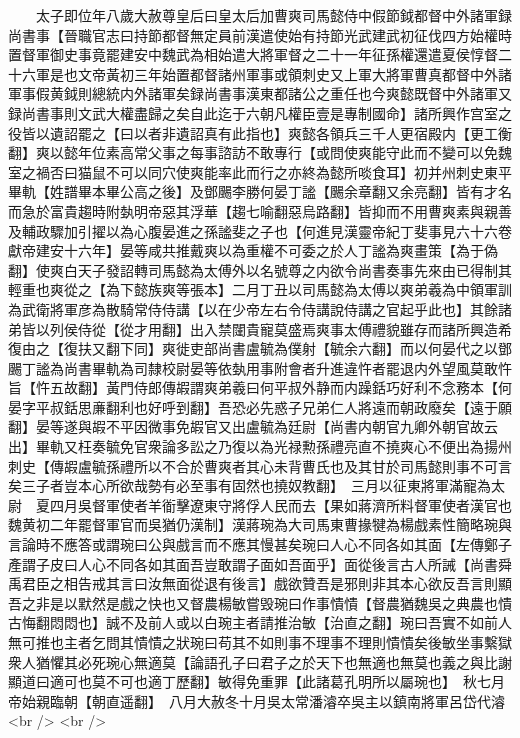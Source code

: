 　　太子即位年八歲大赦尊皇后曰皇太后加曹爽司馬懿侍中假節鉞都督中外諸軍録尚書事【晉職官志曰持節都督無定員前漢遣使始有持節光武建武初征伐四方始權時置督軍御史事竟罷建安中魏武為相始遣大將軍督之二十一年征孫權還遣夏侯惇督二十六軍是也文帝黃初三年始置都督諸州軍事或領刺史又上軍大將軍曹真都督中外諸軍事假黄鉞則總統内外諸軍矣録尚書事漢東都諸公之重任也今爽懿既督中外諸軍又録尚書事則文武大權盡歸之矣自此迄于六朝凡權臣壹是專制國命】諸所興作宫室之役皆以遺詔罷之【曰以者非遺詔真有此指也】爽懿各領兵三千人更宿殿内【更工衡翻】爽以懿年位素高常父事之每事諮訪不敢專行【或問使爽能守此而不變可以免魏室之禍否曰猫鼠不可以同穴使爽能率此而行之亦終為懿所啖食耳】初并州刺史東平畢軌【姓譜畢本畢公高之後】及鄧颺李勝何晏丁謐【颺余章翻又余亮翻】皆有才名而急於富貴趨時附埶明帝惡其浮華【趨七喻翻惡烏路翻】皆抑而不用曹爽素與親善及輔政驟加引擢以為心腹晏進之孫謐斐之子也【何進見漢靈帝紀丁斐事見六十六卷獻帝建安十六年】晏等咸共推戴爽以為重權不可委之於人丁謐為爽畫策【為于偽翻】使爽白天子發詔轉司馬懿為太傅外以名號尊之内欲令尚書奏事先來由已得制其輕重也爽從之【為下懿族爽等張本】二月丁丑以司馬懿為太傅以爽弟羲為中領軍訓為武衛將軍彦為散騎常侍侍講【以在少帝左右令侍講說侍講之官起乎此也】其餘諸弟皆以列侯侍從【從才用翻】出入禁闥貴寵莫盛焉爽事太傅禮貌雖存而諸所興造希復由之【復扶又翻下同】爽徙吏部尚書盧毓為僕射【毓余六翻】而以何晏代之以鄧颺丁謐為尚書畢軌為司隸校尉晏等依埶用事附會者升進違忤者罷退内外望風莫敢忤旨【忤五故翻】黃門侍郎傳嘏謂爽弟羲曰何平叔外静而内躁銛巧好利不念務本【何晏字平叔銛思亷翻利也好呼到翻】吾恐必先惑子兄弟仁人將遠而朝政廢矣【遠于願翻】晏等遂與嘏不平因微事免嘏官又出盧毓為廷尉【尚書内朝官九卿外朝官故云出】畢軌又枉奏毓免官衆論多訟之乃復以為光禄勲孫禮亮直不撓爽心不便出為揚州刺史【傳嘏盧毓孫禮所以不合於曹爽者其心未背曹氏也及其甘於司馬懿則事不可言矣三子者豈本心所欲哉勢有必至事有固然也撓奴教翻】　三月以征東將軍滿寵為太尉　夏四月吳督軍使者羊衜擊遼東守將俘人民而去【果如蔣濟所料督軍使者漢官也魏黄初二年罷督軍官而吳猶仍漢制】漢蔣琬為大司馬東曹掾犍為楊戲素性簡略琬與言論時不應答或謂琬曰公與戲言而不應其慢甚矣琬曰人心不同各如其面【左傳鄭子產謂子皮曰人心不同各如其面吾豈敢謂子面如吾面乎】面從後言古人所誡【尚書舜禹君臣之相告戒其言曰汝無面從退有後言】戲欲贊吾是邪則非其本心欲反吾言則顯吾之非是以默然是戲之快也又督農楊敏嘗毁琬曰作事憒憒【督農猶魏吳之典農也憒古悔翻悶悶也】誠不及前人或以白琬主者請推治敏【治直之翻】琬曰吾實不如前人無可推也主者乞問其憒憒之狀琬曰苟其不如則事不理事不理則憒憒矣後敏坐事繫獄衆人猶懼其必死琬心無適莫【論語孔子曰君子之於天下也無適也無莫也義之與比謝顯道曰適可也莫不可也適丁歷翻】敏得免重罪【此諸葛孔明所以屬琬也】　秋七月帝始親臨朝【朝直遥翻】　八月大赦冬十月吳太常潘濬卒吳主以鎮南將軍呂岱代濬<br />
<br />
